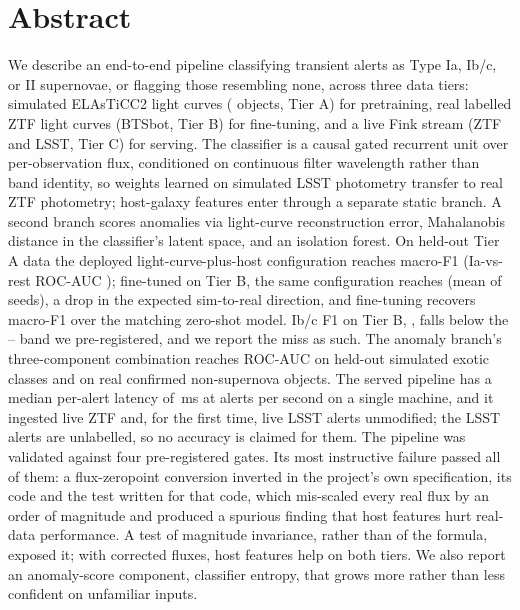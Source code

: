 \chapter*{Abstract}
\noindent
We describe an end-to-end pipeline classifying transient alerts as Type
Ia, Ib/c, or II supernovae, or flagging those resembling none, across
three data tiers: simulated ELAsTiCC2 light curves (\TierATotalObjects{}
objects, Tier A) for pretraining, real labelled ZTF light curves (BTSbot,
Tier B) for fine-tuning, and a live Fink stream (ZTF and LSST, Tier C) for
serving. The classifier is a causal gated recurrent unit over
per-observation flux, conditioned on continuous filter wavelength rather
than band identity, so weights learned on simulated LSST photometry
transfer to real ZTF photometry; host-galaxy features enter through a
separate static branch. A second branch scores anomalies via light-curve
reconstruction error, Mahalanobis distance in the classifier's latent
space, and an isolation forest. On held-out Tier A data the deployed
light-curve-plus-host configuration reaches macro-F1
\TierLCStaticMacroFFull{} (Ia-vs-rest ROC-AUC \TierLCStaticRocAucIaFull{});
fine-tuned on Tier B, the same configuration reaches \WithStaticMacroF{}
(mean of \TierBNSeeds{} seeds), a \SimToRealGapStatic{} drop in the expected
sim-to-real direction, and fine-tuning recovers \TransferGain{} macro-F1
over the matching zero-shot model. Ib/c F1 on Tier B, \WithStaticFIbc{},
falls below the \IbcBandLow{}--\IbcBandHigh{} band we pre-registered, and we
report the miss as such. The anomaly branch's three-component combination
reaches ROC-AUC \AnomalyTierACombinedThreeRecomputed{} on held-out simulated
exotic classes and \AnomalyTierBCombinedThreeRecomputed{} on real confirmed
non-supernova objects. The served pipeline has a median per-alert latency
of \ServingLatencyPFifty{}\,ms at \ServingThroughput{} alerts per second on a
single machine, and it ingested live ZTF and, for the first time, live
LSST alerts unmodified; the LSST alerts are unlabelled, so no accuracy is
claimed for them. The pipeline was validated against four pre-registered
gates. Its most instructive failure passed all of them: a flux-zeropoint
conversion inverted in the project's own specification, its code and the
test written for that code, which mis-scaled every real flux by an order
of magnitude and produced a spurious finding that host features hurt
real-data performance. A test of magnitude invariance, rather than of the
formula, exposed it; with corrected fluxes, host features help on both
tiers. We also report an anomaly-score component, classifier entropy, that
grows more rather than less confident on unfamiliar inputs.
